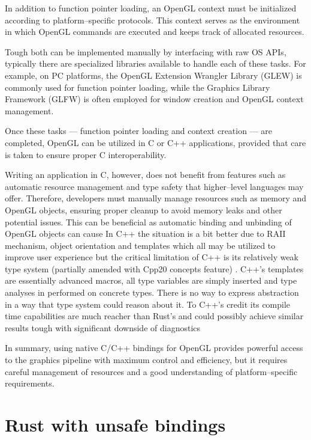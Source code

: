 In addition to function pointer loading, an OpenGL context must be initialized according to platform--specific protocols. 
This context serves as the environment in which OpenGL commands are executed and keeps track of allocated resources.

Tough both can be implemented manually by interfacing with raw OS APIs, typically there are specialized libraries available to handle each of these tasks.
For example, on PC platforms, the OpenGL Extension Wrangler Library (GLEW) \cite{glewwebiste} is commonly used for function pointer loading, 
while the Graphics Library Framework (GLFW) \cite{glfwwebiste} is often employed for window creation and OpenGL context management.

Once these tasks --- function pointer loading and context creation --- are completed, OpenGL can be utilized in C or C++ applications, provided that care is taken to ensure proper C interoperability. 

Writing an application in C, however, does not benefit from features such as automatic resource management and type safety that higher--level languages may offer.
Therefore, developers must manually manage resources such as memory and OpenGL objects, ensuring proper cleanup to avoid memory leaks and other potential issues.
This can be beneficial as automatic binding and unbinding of OpenGL objects can cause 
In C++ the situation is a bit better due to RAII mechanism, object orientation and templates which all may be utilized to improve user experience but the
critical limitation of C++ is its relatively weak type system (partially amended with Cpp20 concepts feature) \cite{cppref}.
C++'s templates are essentially advanced macros, all type variables are simply inserted and type analyses in performed on concrete types.
There is no way to express abstraction in a way that type system could reason about it.
To C++'s credit its compile time capabilities are much reacher than Rust's and could possibly achieve similar results tough
with significant downside of diagnostics 

In summary, using native C/C++ bindings for OpenGL provides powerful access to the graphics pipeline with maximum control and efficiency, 
but it requires careful management of resources and a good understanding of platform--specific requirements.

\section{Rust with unsafe bindings}

